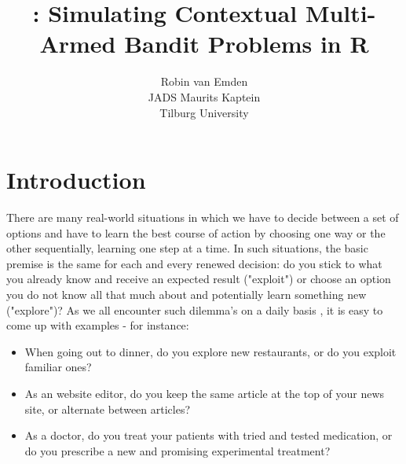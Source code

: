 \documentclass{jss}\usepackage[]{graphicx}\usepackage[]{color}
\author{Robin van Emden\\JADS \And
  Maurits Kaptein\\Tilburg University}
\title{\pkg{contextual}: Simulating Contextual Multi-Armed Bandit Problems in R}
\begin{document}
\sloppy








\section{Introduction}

There are many real-world situations in which we have to decide between a set of options and have to learn the best course of action by choosing one way or the other sequentially, learning one step at a time. In such situations, the basic premise is the same for each and every renewed decision: do you stick to what you already know and receive an expected result ("exploit") or choose an option you do not know all that much about and potentially learn something new ("explore")? As we all encounter such dilemma's on a daily basis \citep{Wilson2014}, it is easy to come up with examples - for instance:

\begin{itemize}
\item When going out to dinner, do you explore new restaurants, or do you exploit familiar ones?
\item As an website editor, do you keep the same article at the top of your news site, or alternate between articles?
\item As a doctor, do you treat your patients with tried and tested medication, or do you prescribe a new and promising experimental treatment?
\end{itemize}
\end{document}
